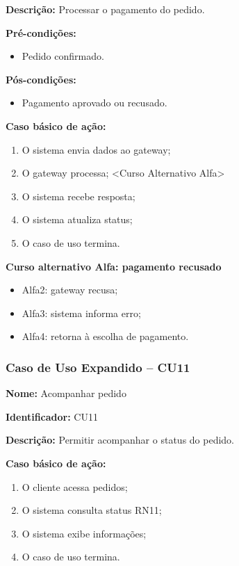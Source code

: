 \documentclass[12pt]{article}
\begin{document}
\textbf{Descrição:} Processar o pagamento do pedido.

\textbf{Pré-condições:}
\begin{itemize}
\item Pedido confirmado.
\end{itemize}

\textbf{Pós-condições:}
\begin{itemize}
\item Pagamento aprovado ou recusado.
\end{itemize}

\textbf{Caso básico de ação:}
\begin{enumerate}
\item O sistema envia dados ao gateway;
\item O gateway processa; <Curso Alternativo Alfa>
\item O sistema recebe resposta;
\item O sistema atualiza status;
\item O caso de uso termina.
\end{enumerate}

\textbf{Curso alternativo Alfa: pagamento recusado}

\begin{itemize}
\item Alfa2: gateway recusa;
\item Alfa3: sistema informa erro;
\item Alfa4: retorna à escolha de pagamento.
\end{itemize}


\subsubsection{Caso de Uso Expandido -- CU11}

\textbf{Nome:} Acompanhar pedido

\textbf{Identificador:} CU11

\textbf{Descrição:} Permitir acompanhar o status do pedido.

\textbf{Caso básico de ação:}
\begin{enumerate}
\item O cliente acessa pedidos;
\item O sistema consulta status RN11;
\item O sistema exibe informações;
\item O caso de uso termina.
\end{enumerate}
\end{document}
